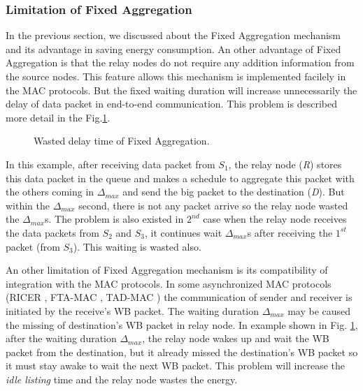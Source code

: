 \subsubsection{Limitation of Fixed Aggregation}
\label{sec:limitation_fa}
In the previous section, we discussed about the Fixed Aggregation mechanism and its advantage in  saving energy consumption. An other advantage of Fixed Aggregation is that the relay nodes do not require any addition information from the source nodes. This feature allows this mechanism is implemented facilely in the MAC protocols. But the fixed waiting duration will increase unnecessarily the delay of data packet in end-to-end communication. This problem is described more detail in the Fig.\ref{fig:fixed_agg_wrong}.
\begin{figure}[!b]
\begin{center}
\caption{Wasted delay time of Fixed Aggregation.}
\label{fig:fixed_agg_wrong}
\end{center}
\end{figure}
In this example, after receiving data packet from $S_1$, the relay node (\textit{R}) stores this data packet in the queue and makes a schedule to aggregate this packet with the others coming in $\Delta_{max}$ and send the big packet to the destination (\textit{D}). But within the $\Delta_{max}$ second, there is not any packet arrive so the relay node wasted the $\Delta_{max}$s. The problem is also existed in $2^{nd}$ case when the relay node receives the data packets from $S_2$ and $S_3$, it continues wait $\Delta_{max}$s after receiving the $1^{st}$ packet (from $S_3$). This waiting is wasted also.

An other limitation of Fixed Aggregation mechanism is its compatibility of integration with the MAC protocols. In some asynchronized MAC protocols (RICER \cite{ricer}, FTA-MAC \cite{fta-mac}, TAD-MAC \cite{tad-mac}) the communication of sender and receiver is initiated by the receive's WB packet. The waiting duration $\Delta_{max}$ may be caused the missing of destination's WB packet in relay node. In example shown in Fig. \ref{fig:fixed_agg_wrong}, after the waiting duration $\Delta_{max}$, the relay node wakes up and wait the WB packet from the destination, but it already missed the destination's WB packet so it must stay awake to wait the next WB packet. This problem will increase the \textit{idle listing} time and the relay node wastes the energy.
